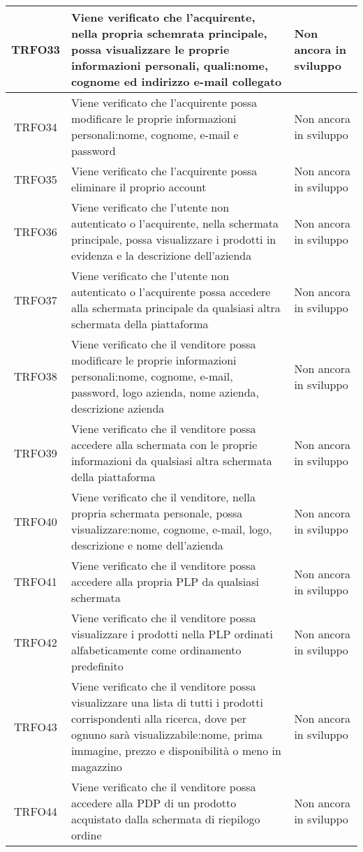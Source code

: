 \begin{longtable}{|c| C{10cm} |C{3cm}|}
	TRFO33 & Viene verificato che l'acquirente, nella propria schemrata principale, possa visualizzare le proprie informazioni personali, quali:nome, cognome ed indirizzo e-mail collegato & Non ancora in sviluppo\\ \hline
	TRFO34 & Viene verificato che l'acquirente possa modificare le proprie informazioni personali:nome, cognome, e-mail e password & Non ancora in sviluppo\\ \hline
	TRFO35 & Viene verificato che l'acquirente possa eliminare il proprio account & Non ancora in sviluppo\\ \hline
	TRFO36 & Viene verificato che l'utente non autenticato o l'acquirente, nella schermata principale, possa visualizzare i prodotti in evidenza e la descrizione dell'azienda & Non ancora in sviluppo\\ \hline
	TRFO37 & Viene verificato che l'utente non autenticato o l'acquirente possa accedere alla schermata principale da qualsiasi altra schermata della piattaforma & Non ancora in sviluppo\\ \hline
    	TRFO38 & Viene verificato che il venditore possa modificare le proprie informazioni personali:nome, cognome, e-mail, password, logo azienda, nome azienda, descrizione azienda & Non ancora in sviluppo\\ \hline
	TRFO39 & Viene verificato che il venditore possa accedere alla schermata con le proprie informazioni da qualsiasi altra schermata della piattaforma & Non ancora in sviluppo\\ \hline
    	TRFO40 & Viene verificato che il venditore, nella propria schermata personale, possa visualizzare:nome, cognome, e-mail, logo, descrizione e nome dell'azienda & Non ancora in sviluppo\\ \hline
	TRFO41 & Viene verificato che il venditore possa accedere alla propria PLP da qualsiasi schermata & Non ancora in sviluppo\\ \hline
	TRFO42 & Viene verificato che il venditore possa visualizzare i prodotti nella PLP ordinati alfabeticamente come ordinamento predefinito & Non ancora in sviluppo\\ \hline
	TRFO43 & Viene verificato che il venditore possa visualizzare una lista di tutti i prodotti corrispondenti alla ricerca, dove per ognuno sarà visualizzabile:nome, prima immagine, prezzo e disponibilità o meno in magazzino & Non ancora in sviluppo\\ \hline
	TRFO44 & Viene verificato che il venditore possa accedere alla PDP di un prodotto acquistato dalla schermata di riepilogo ordine & Non ancora in sviluppo\\ \hline

\end{longtable}
